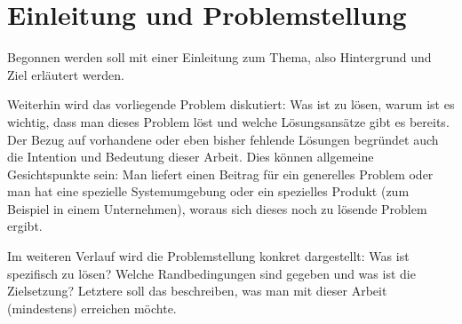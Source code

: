 \chapter{Einleitung und Problemstellung}

Begonnen werden soll mit einer Einleitung zum Thema, also Hintergrund und Ziel erläutert werden.

Weiterhin wird das vorliegende Problem diskutiert: Was ist zu lösen, warum ist es wichtig, dass man dieses Problem löst und welche Lösungsansätze gibt es bereits. Der Bezug auf vorhandene oder eben bisher fehlende Lösungen begründet auch die Intention und Bedeutung dieser Arbeit. Dies können allgemeine Gesichtspunkte sein: Man liefert einen Beitrag für ein generelles Problem oder man hat eine spezielle Systemumgebung oder ein spezielles Produkt (zum Beispiel in einem Unternehmen), woraus sich dieses noch zu lösende Problem ergibt.

Im weiteren Verlauf wird die Problemstellung konkret dargestellt: Was ist spezifisch zu lösen? Welche Randbedingungen sind gegeben und was ist die Zielsetzung? Letztere soll das
beschreiben, was man mit dieser Arbeit (mindestens) erreichen möchte.